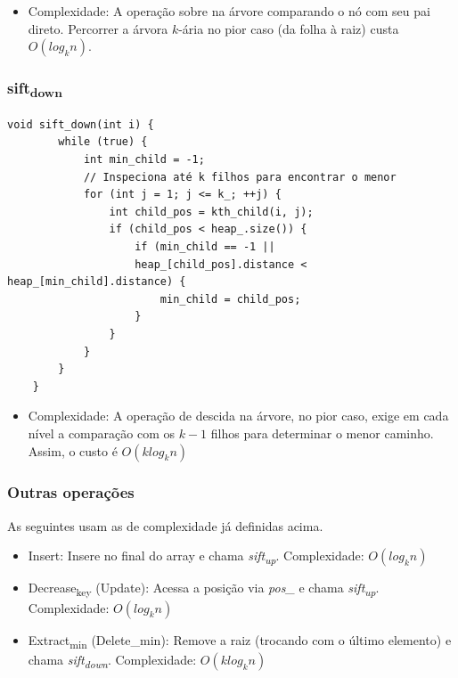 \documentclass{infufrgs}
\begin{document}
\begin{itemize}
    \item Complexidade: A operação sobre na árvore comparando o nó
    com seu pai direto.  Percorrer a árvora $k$-ária no pior caso (da folha à raiz)
     custa $O(log_{k} n)$.
\end{itemize}



%
%
\subsubsection{sift\textsubscript{down}}
\begin{Verbatim}[frame=single, fontsize=\footnotesize]
    void sift_down(int i) {
        while (true) {
            int min_child = -1;
            // Inspeciona até k filhos para encontrar o menor
            for (int j = 1; j <= k_; ++j) {
                int child_pos = kth_child(i, j);
                if (child_pos < heap_.size()) {
                    if (min_child == -1 || 
                    heap_[child_pos].distance < heap_[min_child].distance) {
                        min_child = child_pos;
                    }
                }
            }
        }
    }
\end{Verbatim}

\begin{itemize}
    \item Complexidade: A operação de descida na árvore, no pior caso,
     exige em cada nível a comparação com os $k-1$ filhos para determinar 
     o menor caminho. Assim, o custo é $O(k log_{k} n)$
\end{itemize}



\subsubsection{Outras operações}
As seguintes usam as de complexidade já definidas acima.
\begin{itemize}
    \item Insert: 
    Insere no final do array e chama \textit{sift\textsubscript{up}}. Complexidade: $O(log_{k}n)$
    \item Decrease\textsubscript{key} (Update):
    Acessa a posição via \textit{pos\_} e chama \textit{sift\textsubscript{up}}. Complexidade: $O(log_{k}n)$
    \item Extract\textsubscript{min} (Delete\_min):
    Remove a raiz (trocando com o último elemento) e chama \textit{sift\textsubscript{down}}.
    Complexidade: $O(k log_{k}n)$
\end{itemize}
\end{document}

